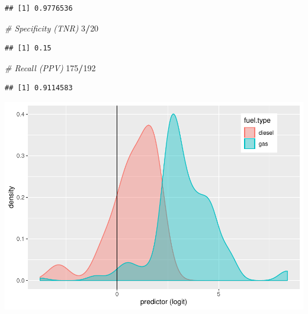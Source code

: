\documentclass[]{article}
\newenvironment{Shaded}{\begin{snugshade}}{\end{snugshade}}
\newcommand{\KeywordTok}[1]{\textcolor[rgb]{0.13,0.29,0.53}{\textbf{#1}}}
\newcommand{\DataTypeTok}[1]{\textcolor[rgb]{0.13,0.29,0.53}{#1}}
\newcommand{\DecValTok}[1]{\textcolor[rgb]{0.00,0.00,0.81}{#1}}
\newcommand{\FloatTok}[1]{\textcolor[rgb]{0.00,0.00,0.81}{#1}}
\newcommand{\StringTok}[1]{\textcolor[rgb]{0.31,0.60,0.02}{#1}}
\newcommand{\CommentTok}[1]{\textcolor[rgb]{0.56,0.35,0.01}{\textit{#1}}}
\newcommand{\OperatorTok}[1]{\textcolor[rgb]{0.81,0.36,0.00}{\textbf{#1}}}
\newcommand{\NormalTok}[1]{#1}
\begin{document}
\begin{verbatim}
## [1] 0.9776536
\end{verbatim}

\begin{Shaded}
\begin{Highlighting}[]
\CommentTok{# Specificity (TNR)}
\DecValTok{3}\OperatorTok{/}\DecValTok{20}
\end{Highlighting}
\end{Shaded}

\begin{verbatim}
## [1] 0.15
\end{verbatim}

\begin{Shaded}
\begin{Highlighting}[]
\CommentTok{# Recall (PPV)}
\DecValTok{175}\OperatorTok{/}\DecValTok{192}
\end{Highlighting}
\end{Shaded}

\begin{verbatim}
## [1] 0.9114583
\end{verbatim}

\begin{Shaded}
\end{Shaded}

\begin{center}\includegraphics{project2_files/figure-latex/unnamed-chunk-5-1} \end{center}
\end{document}
